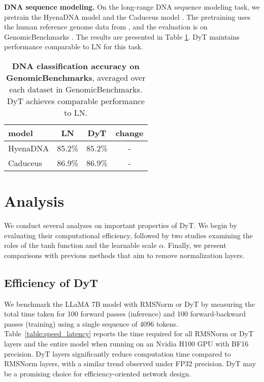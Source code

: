 \documentclass[]{fairmeta}
\newcommand{\tablestyle}[2]{\setlength{\tabcolsep}{#1}\renewcommand{\arraystretch}{#2}\centering\footnotesize}
\renewcommand{\paragraph}[1]{\vspace{1.25mm}\noindent\textbf{#1}}
\begin{document}
\vskip -0.1in
\paragraph{DNA sequence modeling.}
On the long-range DNA sequence modeling task, we pretrain the HyenaDNA model \citep{nguyen2024hyenadna} and the Caduceus model \citep{schiff2024caduceus}. The pretraining uses the human reference genome data from \citep{grch382013p13}, and the evaluation is on GenomicBenchmarks \citep{grevsova2023genomic}. The results are presented in Table \ref{table:dna_sequence}. DyT maintains performance comparable to LN for this task.



\begin{table}[h!]
\centering
\tablestyle{7pt}{1.15}
\begin{tabular}{lccc}
\toprule
model &LN & DyT & change \\
\midrule
HyenaDNA \citep{nguyen2024hyenadna} & 85.2\% & 85.2\% & - \\
Caduceus \citep{schiff2024caduceus} & 86.9\% & 86.9\% & - \\
\midrule
  \end{tabular}
  \caption{\textbf{DNA classification accuracy on GenomicBenchmarks}, averaged over each dataset in GenomicBenchmarks. DyT achieves comparable performance to LN.}
  \label{table:dna_sequence}
  \vspace{-0.2in}
\end{table}





\section{Analysis}

\vspace{-0.05in}
We conduct several analyses on important properties of DyT. We begin by evaluating their computational efficiency, followed by two studies examining the roles of the tanh function and the learnable scale $\alpha$. Finally, we present comparisons with previous methods that aim to remove normalization layers.

\vspace{-0.05in}
\subsection{Efficiency of DyT}

We benchmark the LLaMA 7B model with RMSNorm or DyT by measuring the total time taken for 100 forward passes (inference) and 100 forward-backward passes (training) using a single sequence of 4096 tokens.
Table~\ref{table:speed_latency} reports the time required for all RMSNorm or DyT layers and the entire model when running on an Nvidia H100 GPU with BF16 precision. DyT layers significantly reduce computation time compared to RMSNorm layers, with a similar trend observed under FP32 precision. DyT may be a promising choice for efficiency-oriented network design.
\end{document}
